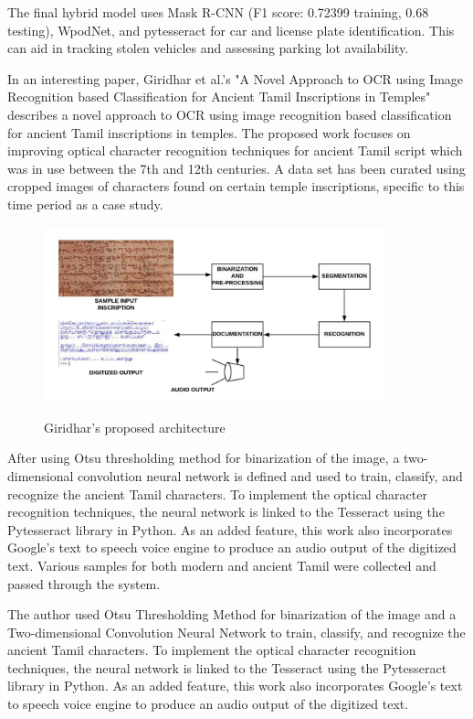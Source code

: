 The final hybrid model uses Mask R-CNN (F1 score: 0.72399 training, 0.68 testing), WpodNet, and pytesseract for car and license plate identification. This can aid in tracking stolen vehicles and assessing parking lot availability.


In an interesting paper, Giridhar et al.'s "A Novel Approach to OCR using Image Recognition based Classification for Ancient Tamil Inscriptions in Temples" describes a novel approach to OCR using image recognition based classification for ancient Tamil inscriptions in temples. The proposed work focuses on improving optical character recognition techniques for ancient Tamil script which was in use between the 7th and 12th centuries. A data set has been curated using cropped images of characters found on certain temple inscriptions, specific to this time period as a case study.

\begin{figure}[ht]
    \centering
    \includegraphics[width=0.88\textwidth]{Figures/tesseract_papers/Giridhar_2019.jpg}
    \caption[Giridhar's proposed architecture]{Giridhar's proposed architecture}\cite{giridharNovelApproachOCR2019}
    \label{fig:Giridhar's proposed architecture}
\end{figure}


After using Otsu thresholding method for binarization of the image, a two-dimensional convolution neural network is defined and used to train, classify, and recognize the ancient Tamil characters. To implement the optical character recognition techniques, the neural network is linked to the Tesseract using the Pytesseract library in Python. As an added feature, this work also incorporates Google's text to speech voice engine to produce an audio output of the digitized text. Various samples for both modern and ancient Tamil were collected and passed through the system.


The author used Otsu Thresholding Method for binarization of the image and a Two-dimensional Convolution Neural Network to train, classify, and recognize the ancient Tamil characters. To implement the optical character recognition techniques, the neural network is linked to the Tesseract using the Pytesseract library in Python. As an added feature, this work also incorporates Google's text to speech voice engine to produce an audio output of the digitized text.

